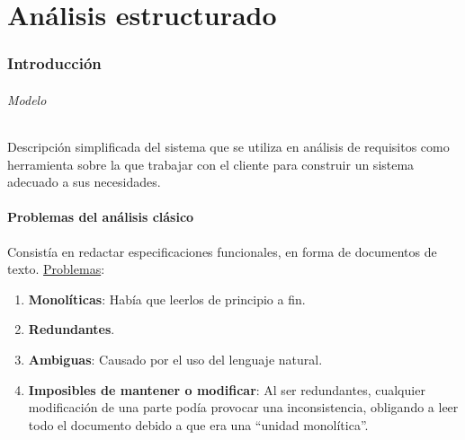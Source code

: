 \part{Análisis estructurado}

\section{Introducción} %
\paragraph{Modelo}
Descripción simplificada del sistema que se utiliza en análisis de requisitos como herramienta sobre la que trabajar con el cliente para construir un sistema adecuado a sus necesidades.



\subsection{Problemas del análisis clásico}
Consistía en redactar especificaciones funcionales, en forma de documentos de texto. \uline{Problemas}:
\begin{enumerate}
    \item \textbf{Monolíticas}: Había que leerlos de principio a fin.
    \item \textbf{Redundantes}.
    \item \textbf{Ambiguas}: Causado por el uso del lenguaje natural.
    \item \textbf{Imposibles de mantener o modificar}: Al ser redundantes, cualquier modificación de una parte podía provocar una inconsistencia, obligando a leer todo el documento debido a que era una ``unidad monolítica''.
\end{enumerate}

